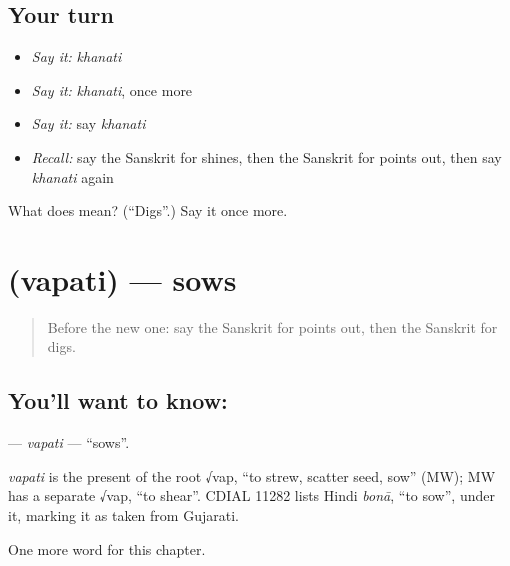 \subsection*{Your turn}
\begin{itemize}
\raggedright
  \item \emph{Say it:} \emph{khanati}
  \item \emph{Say it:} \emph{khanati}, once more
  \item \emph{Say it:} say \emph{khanati}
  \item \emph{Recall:} say the Sanskrit for shines, then the Sanskrit for points out, then say \emph{khanati} again
\end{itemize}

\begin{tcolorbox}[breakable,colback=teal!4,colframe=teal!35!black,title={Before you move on}]
What does  mean? (\textquotedblleft{}Digs\textquotedblright{}.) Say it once more.
\end{tcolorbox}
\section[\texorpdfstring{\sk{वपति} (vapati)}{वपति (vapati)}]{ (vapati) — sows}

\label{lesson:SA-C204-vapati}



\begin{quote}
Before the new one: say the Sanskrit for points out, then the Sanskrit for digs.
\end{quote}

\subsection*{You'll want to know: }
\textbf{} — \emph{vapati} — \textquotedblleft{}sows\textquotedblright{}.

\begin{cousinweb}
\emph{vapati} is the present of the root √vap, \textquotedblleft{}to strew, scatter seed, sow\textquotedblright{} (MW); MW has a separate √vap, \textquotedblleft{}to shear\textquotedblright{}. CDIAL 11282 lists Hindi \emph{bonā}, \textquotedblleft{}to sow\textquotedblright{}, under it, marking it as taken from Gujarati.
\end{cousinweb}

\begin{grammarlens}[title={What you've built}]
One more word for this chapter.
\end{grammarlens}

